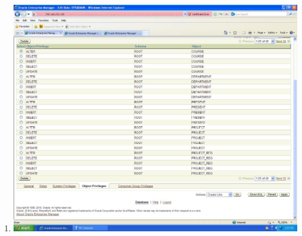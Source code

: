 \documentclass{article}
\begin{document}
\begin{enumerate}
	\item
		\includegraphics[scale=0.4]{figs/9.JPG}\underline{}
\end{enumerate}
\end{document}
